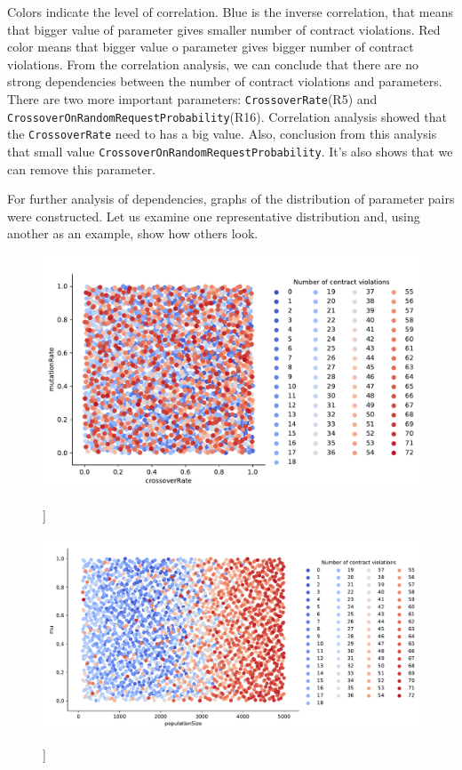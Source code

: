 Colors indicate the level of correlation. Blue is the inverse correlation, that means that bigger value of parameter gives smaller number of contract violations. Red color means that bigger value o parameter gives bigger number of contract violations.
From the correlation analysis, we can conclude that there are no strong dependencies between the number of contract violations and parameters. There are two more important parameters: \texttt{CrossoverRate}(R5) and \texttt{CrossoverOnRandomRequestProbability}(R16).
Correlation analysis showed that the \texttt{CrossoverRate} need to has a big value. Also, conclusion from this analysis that small value  \texttt{CrossoverOnRandomRequestProbability}. It's also shows that we can remove this parameter. 

For further analysis of dependencies, graphs of the distribution of parameter pairs were constructed. Let us examine one representative distribution and, using another as an example, show how others look.

\begin{figure}
	\centering
	\includegraphics[width=\textwidth]{images/CrossoverRateVsutationRate.pdf}
	\caption[]]{}
	\label{fig:CrossoverRateVmutationRate}
\end{figure}

\begin{figure}
	\centering
	\includegraphics[width=\textwidth]{images/populatioSizeVsMu.pdf}
	\caption[]]{}
	\label{fig:populatioSizeVsMu}
\end{figure}

